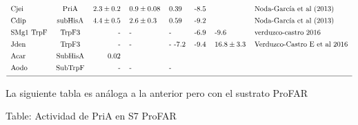 \documentclass[]{article}
\begin{document}
{\[{\begin{tabular}{ l c r l l l l l}
Cjei        &PriA   &$  2.3 \pm 0.2 $&$0.9 \pm 0.08   $&0.39                    &-8.5       &          &Noda-García et al (2013)\\ [1ex]
Cdip        &subHisA&$  4.4 \pm 0.5 $&$2.6 \pm 0.3      $&0.59                  &-9.2       &          &Noda-García et al (2013)\\ [1ex]
SMg1 TrpF   &TrpF3  &   -                &-                &-                       &-6.9     &-9.6      &verduzco-castro 2016\\ [1ex]
Jden        &TrpF3  &   -                &-                &-          -7.2         &-9.4     &$16.8\pm3.3$&    Verduzco-Castro E et al  2016\\ [1ex]
Acar      &SubHisA& 0.02                     &                 &                        &       &          &            \\ [1ex]
Aodo        &SubTrpF&       -              &-                  &-                     &       &          &\\ [1ex]
\hline
\end{tabular}}
\label{tab:PriAPRA}  
\]

\clearpage   La siguiente tabla es análoga a la anterior pero con el
sustrato ProFAR

Table: Actividad de PriA en S7 ProFAR \label{tab:PriAProFAR}

}
\end{document}
